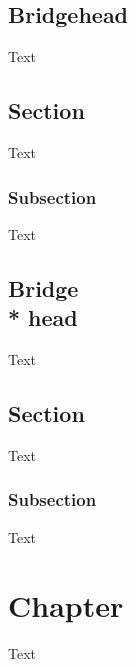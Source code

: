 \documentclass[17pt,a4paper,extrafontsizes,twoside,showtrims,openright]{memoir}
\newcommand{\nocontentsline}[3]{}
\begin{document}
\section*{Bridgehead}
Text

\section[Section]{Section}
Text

\subsection[Subsection]{Subsection}
Text

\setcounter{secnumdepth}{-1}
\bgroup\let\addcontentsline=\nocontentsline
\section[Bridgehead]{Bridge\\*
head}
\egroup
\setcounter{secnumdepth}{1}
Text

\section[Section]{Section}
Text

\subsection[Subsection]{Subsection}
Text

\chapter[Chapter]{Chapter}
Text
\end{document}
